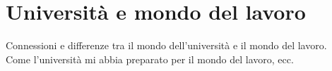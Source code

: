 \section{Università e mondo del lavoro}
\label{sez:universita-mondo-lavoro}

Connessioni e differenze tra il mondo dell'università e il mondo del lavoro.\\
Come l'università mi abbia preparato per il mondo del lavoro, ecc.\\
